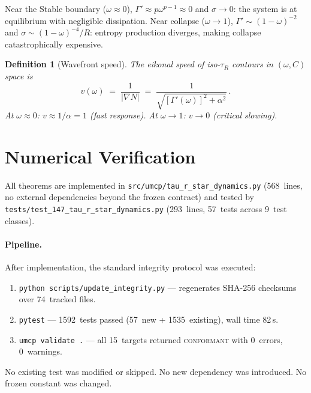 \documentclass[
  aps,
  prd,
  twocolumn,
  showpacs,
  superscriptaddress,
  nofootinbib,
  floatfix
]{revtex4-2}
\newtheorem{definition}[theorem]{Definition}
\newcommand{\tR}{\tau_{\!R}}
\newcommand{\Gam}{\Gamma}
\newcommand{\beq}{\begin{equation}}
\newcommand{\eeq}{\end{equation}}
\begin{document}
Near the Stable boundary ($\omega\approx 0$),
$\Gam'\approx p\omega^{p-1}\approx 0$ and $\sigma\to 0$:
the system is at equilibrium with negligible dissipation.
Near collapse ($\omega\to 1$),
$\Gam'\sim (1-\omega)^{-2}$ and
$\sigma\sim(1-\omega)^{-4}/R$: entropy production diverges,
making collapse catastrophically expensive.

\begin{definition}[Wavefront speed]\label{def:wavefront}
The eikonal speed of iso-$\tR$ contours in $(\omega,C)$ space is
\beq\label{eq:wavefront}
  v(\omega) \;=\;
  \frac{1}{|\nabla N|}
  \;=\;
  \frac{1}{\sqrt{[\Gam'(\omega)]^2 + \alpha^2}}\,.
\eeq
At $\omega\approx 0$: $v\approx 1/\alpha=1$ (fast response).
At $\omega\to 1$: $v\to 0$ (critical slowing).
\end{definition}

\section{Numerical Verification}\label{sec:numerics}

All theorems are implemented in
\texttt{src/umcp/tau\_r\_star\_dynamics.py}
(568~lines, no external dependencies beyond the frozen contract)
and tested by
\texttt{tests/test\_147\_tau\_r\_star\_dynamics.py}
(293~lines, 57~tests across 9~test classes).

\paragraph{Pipeline.}
After implementation, the standard integrity protocol was executed:
\begin{enumerate}
  \item \texttt{python scripts/update\_integrity.py}
        --- regenerates SHA-256
        checksums over 74~tracked files.
  \item \texttt{pytest} --- 1592~tests passed (57~new + 1535~existing),
        wall time 82\,s.
  \item \texttt{umcp validate~.} --- all 15~targets returned
        \textsc{conformant} with 0~errors, 0~warnings.
\end{enumerate}

No existing test was modified or skipped.
No new dependency was introduced.
No frozen constant was changed.
\end{document}
